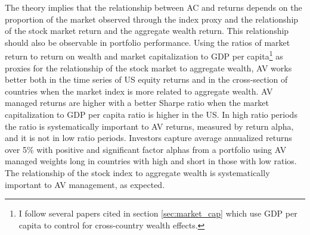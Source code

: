 The \citet{pollet_average_2010} theory implies that the relationship between AC and returns depends on the proportion of the market observed through the index proxy and the relationship of the stock market return and the aggregate wealth return. This relationship should also be observable in portfolio performance. Using the ratios of market return to return on wealth and market capitalization to GDP per capita\footnote{I follow several papers cited in section \ref{sec:market_cap} which use GDP per capita to control for cross-country wealth effects.} as proxies for the relationship of the stock market to aggregate wealth, AV works better both in the time series of US equity returns and in the cross-section of countries when the market index is more related to aggregate wealth. AV managed returns are higher with a better Sharpe ratio when the market capitalization to GDP per capita ratio is higher in the US. In high ratio periods the ratio is systematically important to AV returns, measured by return alpha, and it is not in low ratio periods.  Investors capture average annualized returns over 5\% with positive and significant factor alphas from a portfolio using AV managed weights long in countries with high and short in those with low ratios. The relationship of the stock index to aggregate wealth is systematically important to AV management, as expected.

